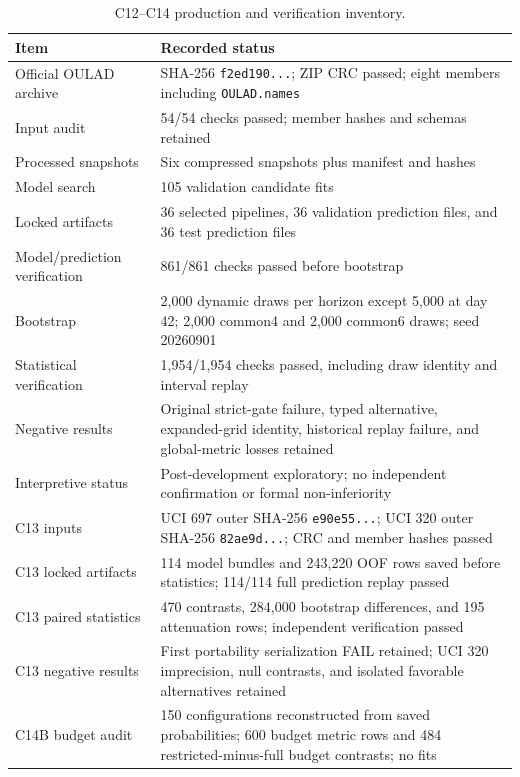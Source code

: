 \documentclass[education,supfile,submit,moreauthors]{Definitions/mdpi}
\begin{document}
\begin{table}[H]
\centering
\caption{C12--C14 production and verification inventory.}
\label{tab:s_inventory}
\small
\begin{tabularx}{\textwidth}{>{\raggedright\arraybackslash}p{} X}
\toprule
Item & Recorded status \\
\midrule
Official OULAD archive & SHA-256 \texttt{f2ed190...}; ZIP CRC passed; eight members including \texttt{OULAD.names} \\
Input audit & 54/54 checks passed; member hashes and schemas retained \\
Processed snapshots & Six compressed snapshots plus manifest and hashes \\
Model search & 105 validation candidate fits \\
Locked artifacts & 36 selected pipelines, 36 validation prediction files, and 36 test prediction files \\
Model/prediction verification & 861/861 checks passed before bootstrap \\
Bootstrap & 2,000 dynamic draws per horizon except 5,000 at day 42; 2,000 common4 and 2,000 common6 draws; seed 20260901 \\
Statistical verification & 1,954/1,954 checks passed, including draw identity and interval replay \\
Negative results & Original strict-gate failure, typed alternative, expanded-grid identity, historical replay failure, and global-metric losses retained \\
Interpretive status & Post-development exploratory; no independent confirmation or formal non-inferiority \\
C13 inputs & UCI 697 outer SHA-256 \texttt{e90e55...}; UCI 320 outer SHA-256 \texttt{82ae9d...}; CRC and member hashes passed \\
C13 locked artifacts & 114 model bundles and 243,220 OOF rows saved before statistics; 114/114 full prediction replay passed \\
C13 paired statistics & 470 contrasts, 284,000 bootstrap differences, and 195 attenuation rows; independent verification passed \\
C13 negative results & First portability serialization FAIL retained; UCI 320 imprecision, null contrasts, and isolated favorable alternatives retained \\
C14B budget audit & 150 configurations reconstructed from saved probabilities; 600 budget metric rows and 484 restricted-minus-full budget contrasts; no fits \\

\end{tabularx}
\end{table}
\end{document}
